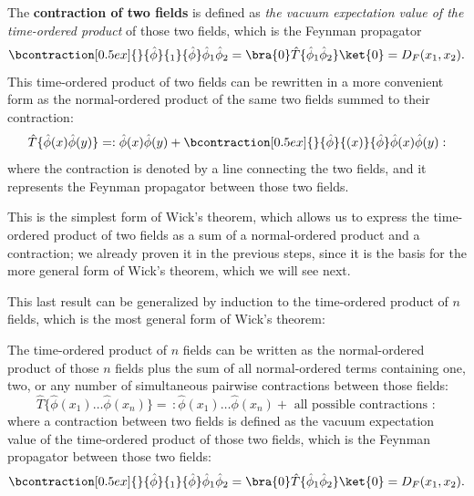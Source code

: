 \begin{definition}
    The \textbf{contraction of two fields} is defined as \textit{the vacuum expectation value of the time-ordered product} of those two fields, which is the Feynman propagator
    \[
        \bcontraction[0.5ex]{}{\hat{\phi}}{_1}{\hat{\phi}} \hat{\phi}_1 \hat{\phi}_2 = \bra{0} \hat{T} \{ \hat{\phi}_1 \hat{\phi}_2 \} \ket{0} = D_F (x_1,x_2).
    \]
    This time-ordered product of two fields can be rewritten in a more convenient form as the normal-ordered product of the same two fields summed to their contraction:
    \[
        \hat{T} \{ \hat{\phi} (x) \hat{\phi} (y) \} = : \hat{\phi} (x) \hat{\phi} (y) + \bcontraction[0.5ex]{}{\hat{\phi}}{(x)}{\hat{\phi}} \hat{\phi} (x) \hat{\phi} (y) :
    \]
    where the contraction is denoted by a line connecting the two fields, and it represents the Feynman propagator between those two fields.
\end{definition}
This is the simplest form of Wick's theorem, which allows us to express the time-ordered product of two fields as a sum of a normal-ordered product and a contraction; we already proven it in the previous steps, since it is the basis for the more general form of Wick's theorem, which we will see next.

This last result can be generalized by induction to the time-ordered product of \(n\) fields, which is the most general form of Wick's theorem:

\begin{theorem}
    The time-ordered product of \(n\) fields can be written as the normal-ordered product of those \(n\) fields plus the sum of all normal-ordered terms containing one, two, or any number of simultaneous pairwise contractions between those fields:
    \[
        \hat{T} \{ \hat{\phi} (x_1) \dots \hat{\phi} (x_n) \} = \, : \hat{\phi} (x_1) \dots \hat{\phi} (x_n) + \text{ all possible contractions }:
    \]
    where a contraction between two fields is defined as the vacuum expectation value of the time-ordered product of those two fields, which is the Feynman propagator between those two fields:
    \[
        \bcontraction[0.5ex]{}{\hat{\phi}}{_1}{\hat{\phi}} \hat{\phi}_1 \hat{\phi}_2 = \bra{0} \hat{T} \{ \hat{\phi}_1 \hat{\phi}_2 \} \ket{0} = D_F (x_1,x_2).
    \]
\end{theorem}

